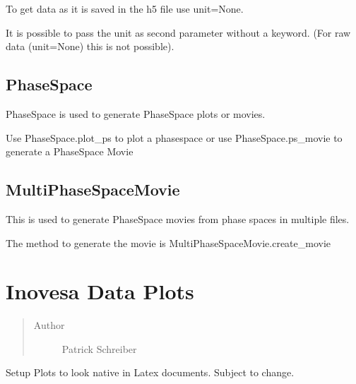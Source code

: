 \documentclass[letterpaper,10pt,openany,oneside,english]{sphinxmanual}
\begin{document}
To get data as it is saved in the h5 file use unit=None.

It is possible to pass the unit as second parameter without a keyword. (For raw data (unit=None) this is not possible).


\section{PhaseSpace}
\label{\detokenize{simpleusage:phasespace}}
PhaseSpace is used to generate PhaseSpace plots or movies.

Use PhaseSpace.plot\_ps to plot a phasespace or use PhaseSpace.ps\_movie to generate a PhaseSpace Movie


\section{MultiPhaseSpaceMovie}
\label{\detokenize{simpleusage:multiphasespacemovie}}
This is used to generate PhaseSpace movies from phase spaces in multiple files.

The method to generate the movie is MultiPhaseSpaceMovie.create\_movie
\label{\detokenize{plots:module-plots}}

\chapter{Inovesa Data Plots}
\label{\detokenize{plots:plots}}\label{\detokenize{plots::doc}}\label{\detokenize{plots:inovesa-data-plots}}\begin{quote}\begin{description}
\item[{Author}] \leavevmode
Patrick Schreiber

\end{description}\end{quote}

\begin{fulllineitems}
\label{\detokenize{plots:plots.Deprecated}}
\end{fulllineitems}



\begin{fulllineitems}
Setup Plots to look native in Latex documents. Subject to change.

\end{fulllineitems}
\end{document}
